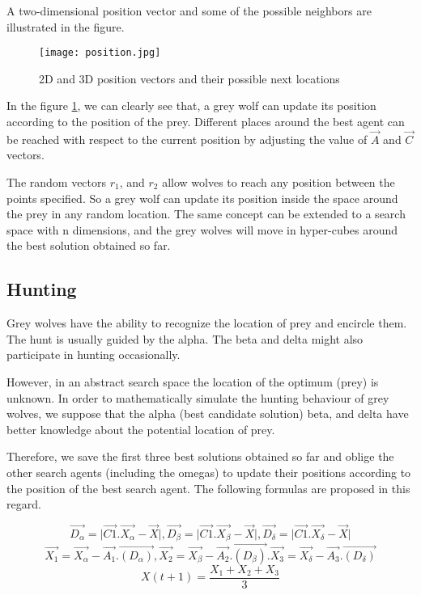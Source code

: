 \documentclass[11pt]{report}
\begin{document}
A two-dimensional position vector and some of the possible neighbors are illustrated in the figure.
\begin{figure}[!h]
\begin{center}
     \texttt{[image: position.jpg]}
     \caption {2D and 3D position vectors and their possible next locations }
     \label{position}
\end{center}

\end{figure}
In the figure \ref{position}, we can clearly see that, a  grey wolf can update its position according to the position of the prey. Different places around the best agent can be reached with respect to the current position by adjusting the value of $\vec{A}$ and $\vec{C}$ vectors. 
\par The random vectors $r_1$, and $r_2$ allow wolves to reach any position between the points specified. So a grey wolf can update its position inside the space around the prey in any random location.
The same concept can be extended to a search space with n dimensions, and the grey wolves will move in hyper-cubes around the best solution obtained so far. 

\subsection{Hunting}
\par Grey wolves have the ability to recognize the location of prey and encircle them. The hunt is usually guided 
by the alpha. The beta and delta might also participate in hunting occasionally. 
\par However, in an abstract search space the location of the optimum (prey) is unknown. In order to mathematically simulate the hunting behaviour  of  grey  wolves,  we  suppose  that  the  alpha  (best  candidate  solution)  beta,  and  delta  have  better knowledge about the potential location of prey. \par Therefore, we save the first three best solutions obtained so far 
and oblige the other search agents (including the omegas) to update their positions according to the position of 
the best search agent. The following formulas are proposed in this regard.


\begin{equation}
\vec{D_{\alpha}} = \lvert \vec{C1}.\vec{X_{\alpha}} -\vec{X} \rvert,\vec{D_{\beta}} = \lvert \vec{C1}.\vec{X_{\beta}} -\vec{X} \rvert, \vec{D_{\delta}} = \lvert \vec{C1}.\vec{X_{\delta}} -\vec{X} \rvert
\end{equation}
\begin{equation}
\vec{X_{1}} =\vec{X_{\alpha}} -\vec{A_{1}}.\vec{(D_{\alpha})},\vec{X_{2}} =\vec{X_{\beta}} -\vec{A_{2}}.\vec{(D_{\beta})}.\vec{X_{3}} =\vec{X_{\delta}} -\vec{A_{3}}.\vec{(D_{\delta})}
\end{equation}
\begin{equation}
X(t+1) = \frac{X_1+X_2+X_3}{3}
\end{equation} 
\end{document}
